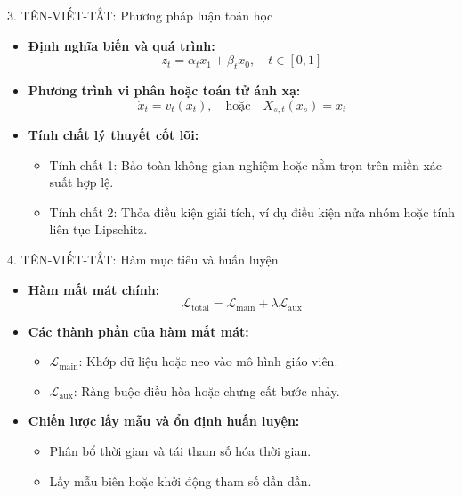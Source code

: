 \begin{frame}{3. TÊN-VIẾT-TẮT: Phương pháp luận toán học}
    \begin{itemize}
        \item \textbf{Định nghĩa biến và quá trình:}
        $$z_t = \alpha_t x_1 + \beta_t x_0, \quad t \in [0, 1]$$
        \item \textbf{Phương trình vi phân hoặc toán tử ánh xạ:}
        $$\dot{x}_t = v_t(x_t), \quad \text{hoặc} \quad X_{s,t}(x_s) = x_t$$
        \item \textbf{Tính chất lý thuyết cốt lõi:}
        \begin{itemize}
            \item Tính chất 1: Bảo toàn không gian nghiệm hoặc nằm trọn trên miền xác suất hợp lệ.
            \item Tính chất 2: Thỏa điều kiện giải tích, ví dụ điều kiện nửa nhóm hoặc tính liên tục Lipschitz.
        \end{itemize}
    \end{itemize}
\end{frame}

\begin{frame}{4. TÊN-VIẾT-TẮT: Hàm mục tiêu và huấn luyện}
    \begin{itemize}
        \item \textbf{Hàm mất mát chính:}
        $$\mathcal{L}_{\text{total}} = \mathcal{L}_{\text{main}} + \lambda \mathcal{L}_{\text{aux}}$$
        \item \textbf{Các thành phần của hàm mất mát:}
        \begin{itemize}
            \item $\mathcal{L}_{\text{main}}$: Khớp dữ liệu hoặc neo vào mô hình giáo viên.
            \item $\mathcal{L}_{\text{aux}}$: Ràng buộc điều hòa hoặc chưng cất bước nhảy.
        \end{itemize}
        \item \textbf{Chiến lược lấy mẫu và ổn định huấn luyện:}
        \begin{itemize}
            \item Phân bổ thời gian và tái tham số hóa thời gian.
            \item Lấy mẫu biên hoặc khởi động tham số dần dần.
        \end{itemize}
    \end{itemize}
\end{frame}

